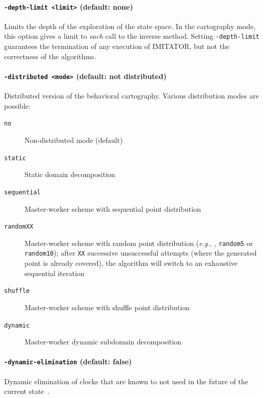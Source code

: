 \documentclass[a4paper,11pt]{report}
\newcommand{\imitator}{\textsf{IMITATOR}}
\newcommand{\styleOption}[1]{\textcolor{optioncolor}{\texttt{#1}}}
\newcommand{\eg}{\textcolor{colorok}{\textit{e.g.}, }}
\begin{document}
\paragraph{\styleOption{-depth-limit <limit>} (default: none)}
Limits the depth of the exploration of the state space.
In the cartography mode, this option gives a limit to \emph{each} call to the inverse method.
Setting \styleOption{-depth-limit} guarantees the termination of any execution of \imitator{}, but not the correctness of the algorithms.


\paragraph{\styleOption{-distributed <mode>} (default: not distributed)}
Distributed version of the behavioral cartography.
Various distribution modes are possible:

\begin{description}
	\item[\styleOption{no}] Non-distributed mode (default)
	\item[\styleOption{static}] Static domain decomposition \cite{ACN15}
	\item[\styleOption{sequential}] Master-worker scheme with sequential point distribution \cite{ACE14}
	\item[\styleOption{randomXX}] Master-worker scheme with random point distribution (\eg{}, \styleOption{random5} or \styleOption{random10}); after \styleOption{XX} successive unsuccessful attempts (where the generated point is already covered), the algorithm will switch to an exhaustive sequential iteration \cite{ACE14}
	\item[\styleOption{shuffle}] Master-worker scheme with shuffle point distribution \cite{ACN15}
	\item[\styleOption{dynamic}] Master-worker dynamic subdomain decomposition \cite{ACN15}
\end{description}




\paragraph{\styleOption{-dynamic-elimination} (default: false)}
Dynamic elimination of clocks that are known to not used in the future of the current state~\cite{Andre13FSFMA}.
\end{document}
